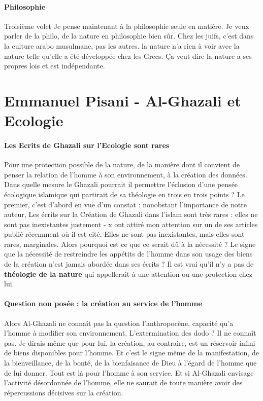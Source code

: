 \paragraph{Philosophie} Troisième volet Je pense maintenant à la philosophie seule en matière. Je veux parler de la philo, de la nature en philosophie bien sûr. Chez les juifs, c'est dans la culture arabo musulmane, pas les autres.  la nature n'a rien à voir avec la nature telle qu'elle a été développée chez les Grecs.
Ça veut dire la nature a ses propres lois et est indépendante. 

\section{Emmanuel Pisani - Al-Ghazali et Ecologie}
\label{theol:AlGazali25}

    \paragraph{Les Ecrits de Ghazali sur l'Ecologie sont rares}Pour une protection possible de la nature, de la manière dont il convient de penser la relation de l'homme à son environnement, à la création des données. Dans quelle mesure le Ghazali pourrait il permettre l'éclosion d'une pensée écologique islamique qui partirait de sa théologie en trois en trois points ? Le premier, c'est d'abord en vue d'un constat : nonobstant l'importance de notre auteur, Les écrits sur la Création de Ghazali dans l'islam sont très rares : elles ne sont pas inexistantes justement - x ont attiré mon attention sur un de ses articles publié récemment où il est cité.
Elles ne sont pas inexistantes, mais elles sont rares, marginales. Alors pourquoi est ce que ce serait dû à la nécessité ? Le signe que la nécessité de restreindre les appétits de l'homme dans son usage des biens de la création n'est jamais abordée dans ses écrits ? Il est vrai qu'il n'y a pas de \textbf{théologie de la nature} qui appellerait à une attention ou une protection chez lui.

\paragraph{Question non posée : la création au service de l'homme}

    

Alors Al-Ghazali ne connaît pas la question l'anthropocène, capacité qu'a l'homme à modifier son environnement, L'extermination des dodo ? Il ne connaît pas. 
Je dirais même que pour lui, la création, au contraire, est un réservoir infini de biens disponibles pour l'homme. Et c'est le signe même de la manifestation, de la bienveillance, de la bonté, de la bienfaisance de Dieu à l'égard de l'homme que de lui donner.
Tout est là pour l'homme à son service. Et si Al-Ghazali envisage l'activité désordonnée de l'homme, elle ne saurait de toute manière avoir des répercussions décisives sur la création. 


